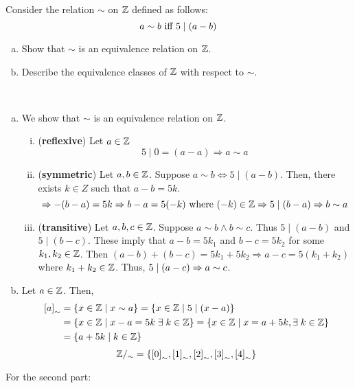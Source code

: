 \begin{exercise}
    Consider the relation $\sim$ on $\mathbb{Z}$ defined as follows: 
    \[ a \sim b \text{ iff } 5 \mid \qty(a - b) \]
    \begin{enumerate}[a.]
        \item Show that $\sim$ is an equivalence relation on $\mathbb{Z}$.
        \item Describe the equivalence classes of $\mathbb{Z}$ with respect to $\sim$.
    \end{enumerate}
\end{exercise}

\begin{solution} \phantom{blank} \\
\begin{enumerate}[a.]
    \item We show that $\sim$ is an equivalence relation on $\mathbb{Z}$. \\
        \begin{enumerate}[i.]
            \item (\textbf{reflexive}) Let $a \in \mathbb{Z}$
            \[ 5 \mid 0 = (a - a) \Rightarrow a \sim a \] 
            \item (\textbf{symmetric}) Let $a ,b \in \mathbb{Z}$. Suppose $a \sim b \Leftrightarrow 5 \mid (a - b)$. Then, there exists $k \in Z$ such that $a - b = 5k$. 
            \[ \Rightarrow - \qty(b - a) = 5k \Rightarrow b - a = 5 \qty(-k) \text{ where } (-k) \in \mathbb{Z} \Rightarrow 5 \mid \qty(b - a) \Rightarrow b \sim a \]
            \item (\textbf{transitive}) Let $a, b, c \in \mathbb{Z}$. Suppose $a \sim b \land b \sim c$. Thus $5 \mid (a - b)$ and $5 \mid (b - c)$. These imply that $a - b = 5k_1$ and $b - c = 5k_2$ for some $k_1, k_2 \in \mathbb{Z}$. Then $(a - b) + (b -c) = 5k_1 + 5k_2 \Rightarrow a - c = 5 (k_1 + k_2)$ where $k_1 + k_2 \in \mathbb{Z}$. Thus, $5 \mid \qty(a -c) \Rightarrow a \sim c$.
        \end{enumerate}
    \item Let $a \in \mathbb{Z}$. Then,
        \begin{align*}
            \qty[a]_{\sim} &= \qty{x \in \mathbb{Z}\mid x \sim a} = \qty{x \in \mathbb{Z}\mid 5 \mid \qty(x - a)} \\
            &= \qty{x \in \mathbb{Z}\mid x - a = 5k \; \exists \; k \in \mathbb{Z}} = \qty{x \in \mathbb{Z}\mid x = a + 5k, \exists \; k \in \mathbb{Z}} \\
            &= \qty{a + 5k \mid k \in \mathbb{Z}} 
        \end{align*}
        \[ \mathbb{Z} /_{\sim} = \qty{\qty[0]_{\sim}, \qty[1]_{\sim}, \qty[2]_{\sim}, \qty[3]_{\sim}, \qty[4]_{\sim}} \]
\end{enumerate}
    
    For the second part:
    

\end{solution}

